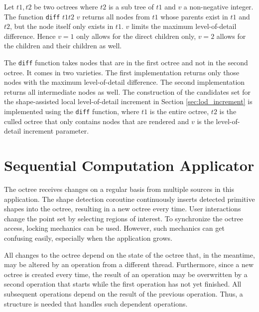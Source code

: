 Let $t1, t2$ be two octrees where $t2$ is a sub tree of $t1$ and $v$ a non-negative integer. The function \verb|diff| $t1 t2$ $v$ returns all nodes from $t1$ whose parents exist in $t1$ and $t2$, but the node itself only exists in $t1$. $v$ limits the maximum level-of-detail difference. Hence $v = 1$ only allows for the direct children only, $v = 2$ allows for the children and their children as well. 

\par

The \verb|diff| function takes nodes that are in the first octree and not in the second octree. It comes in two varieties. The first implementation returns only those nodes with the maximum level-of-detail difference. The second implementation returns all intermediate nodes as well. 
The construction of the candidates set for the shape-assisted local level-of-detail increment in Section \ref{sec:lod_increment} is implemented using the \verb|diff| function, where $t1$ is the entire octree, $t2$ is the culled octree that only contains nodes that are rendered and $v$ is the level-of-detail increment parameter.  


\section{Sequential Computation Applicator}

The octree receives changes on a regular basis from multiple sources in this application. The shape detection coroutine continuously inserts detected primitive shapes into the octree, resulting in a new octree every time. User interactions change the point set by selecting regions of interest. To synchronize the octree access, locking mechanics can be used. However, such mechanics can get confusing easily, especially when the application grows. 

\par

All changes to the octree depend on the state of the octree that, in the meantime, may be altered by an operation from a different thread. Furthermore, since a new octree is created every time, the result of an operation may be overwritten by a second operation that starts while the first operation has not yet finished. All subsequent operations depend on the result of the previous operation. Thus, a structure is needed that handles such dependent operations. 

\par

